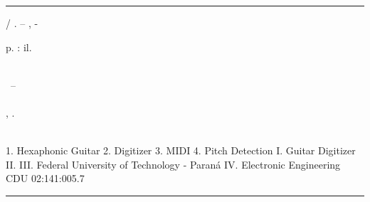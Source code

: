 %     
\begin{catalographiccard}
	\vspace*{\fill}					%
	\hrule							%
	\begin{center}					%
	\begin{minipage}[c]{12.5cm}		%

	\printauthor

	\hspace{0.5cm} \printtitle  / \printauthor. --
	\printlocal, \printdate-

	\hspace{0.5cm} \pageref{LastPage} p. : il.\\

	\hspace{0.5cm} \printadvisorLabel~\printadvisor\\

	\hspace{0.5cm}
	\parbox[t]{\textwidth}{\printtypeofdocument~--~\printinstitution\\\printcourse\\\printdepartment,
	\printdate.}\\

	\hspace{0.5cm}
		1. Hexaphonic Guitar
		2. Digitizer
		3. MIDI
		4. Pitch Detection
		I. Guitar Digitizer
		II. \printadvisor
		III. Federal University of Technology - Paraná
		IV. Electronic Engineering\\

	\hspace{8.75cm} CDU 02:141:005.7\\

	\end{minipage}
	\end{center}
	\hrule
\end{catalographiccard}

